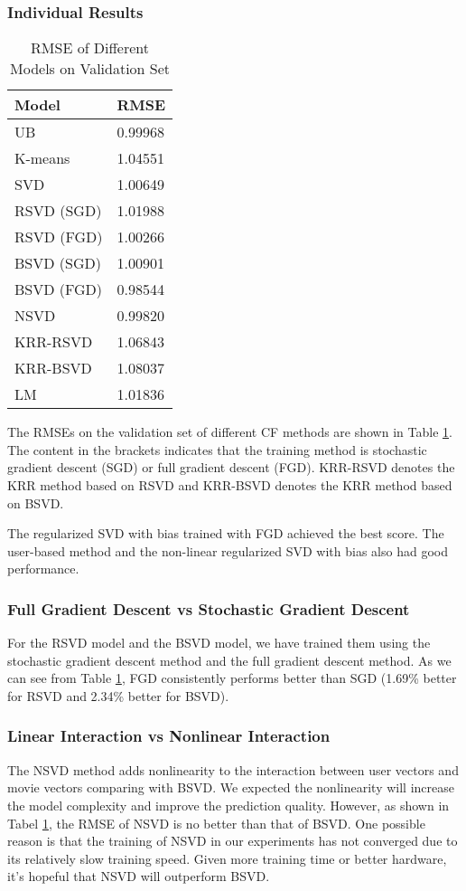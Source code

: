 \documentclass[10pt,conference,compsocconf]{IEEEtran}
\begin{document}
\subsubsection{Individual Results}
\begin{table}[htbp]
  \centering
  \begin{tabular}[c]{|l||l|}
    \hline
    Model&RMSE\\
    \hline
    UB&0.99968\\
    K-means&1.04551\\
    SVD&1.00649\\
    RSVD (SGD)&1.01988\\
    RSVD (FGD)&1.00266\\
    BSVD (SGD)&1.00901\\
    BSVD (FGD)&0.98544\\
    NSVD&0.99820\\
    KRR-RSVD&1.06843\\
    KRR-BSVD&1.08037\\
    LM&1.01836\\
    \hline
  \end{tabular}
    \caption{  \label{mytable} RMSE of Different Models on Validation Set}
\end{table}

The RMSEs on the validation set of different CF methods are shown in Table \ref{mytable}. The content in the brackets indicates that the training method is stochastic gradient descent (SGD) or full gradient descent (FGD). KRR-RSVD denotes the KRR method based on RSVD and KRR-BSVD denotes the KRR method based on BSVD.

The regularized SVD with bias trained with FGD achieved the best score. The user-based method and the non-linear regularized SVD with bias also had good performance.

\subsubsection{Full Gradient Descent vs Stochastic Gradient Descent}
For the RSVD model and the BSVD model, we have trained them using the stochastic gradient descent method and the full gradient descent method. As we can see from Table \ref{mytable}, FGD consistently performs better than SGD (1.69\% better for RSVD and 2.34\% better for BSVD).

\subsubsection{Linear Interaction vs Nonlinear Interaction}
The NSVD method adds nonlinearity to the interaction between user vectors and movie vectors comparing with BSVD. We expected the nonlinearity will increase the model complexity and improve the prediction quality. However, as shown in Tabel \ref{mytable}, the RMSE of NSVD is no better than that of BSVD. One possible reason is that the training of NSVD in our experiments has not converged due to its relatively slow training speed. Given more training time or better hardware, it's hopeful that NSVD will outperform BSVD.
\end{document}
